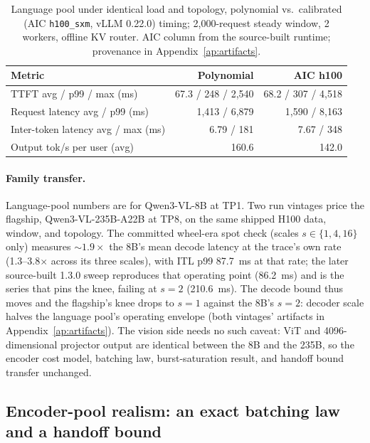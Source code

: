 \begin{table}[htbp]
\centering
\caption[Language pool: polynomial versus calibrated timing]{Language pool
under identical load and topology, polynomial vs.\ calibrated (AIC
\texttt{h100\_sxm}, vLLM 0.22.0) timing; 2{,}000-request steady window, 2
workers, offline KV router. AIC column from the source-built runtime;
provenance in Appendix~\ref{ap:artifacts}.}
\label{tab:sim-poly-aic}
\small
\begin{tabular}{lrr}
\toprule
Metric & Polynomial & AIC h100 \\
\midrule
TTFT avg / p99 / max (ms) & 67.3 / 248 / 2{,}540 & 68.2 / 307 / 4{,}518 \\
Request latency avg / p99 (ms) & 1{,}413 / 6{,}879 & 1{,}590 / 8{,}163 \\
Inter-token latency avg / max (ms) & 6.79 / 181 & 7.67 / 348 \\
Output tok/s per user (avg) & 160.6 & 142.0 \\
\bottomrule
\end{tabular}
\end{table}

\paragraph{Family transfer.} Language-pool numbers are for Qwen3-VL-8B at
TP1. Two run vintages price the flagship, Qwen3-VL-235B-A22B at TP8, on the
same shipped H100 data, window, and topology. The committed wheel-era spot
check (scales $s\in\{1,4,16\}$ only) measures ${\sim}1.9\times$ the 8B's
mean decode latency at the trace's own rate (1.3--3.8$\times$ across its
three scales), with ITL p99 \SI{87.7}{\milli\second} at that rate; the later
source-built 1.3.0 sweep reproduces that operating point
(\SI{86.2}{\milli\second}) and is the series that pins the knee, failing at
$s{=}2$ (\SI{210.6}{\milli\second}). The decode bound thus moves and the
flagship's knee drops to $s{=}1$ against the 8B's $s{=}2$: decoder scale
halves the language pool's operating envelope (both vintages' artifacts in
Appendix~\ref{ap:artifacts}). The vision side needs no such caveat: ViT and
4096-dimensional projector output are identical between the 8B and the 235B,
so the encoder cost model, batching law, burst-saturation result, and
handoff bound transfer unchanged.

\subsection{Encoder-pool realism: an exact batching law and a handoff bound}
\label{sec:sim-encoder}

